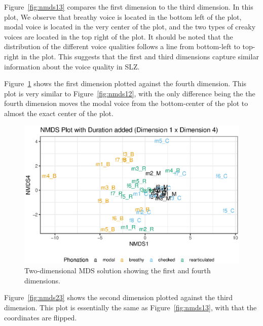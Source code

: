 Figure~\ref{fig:nmds13} compares the first dimension to the third dimension. In this plot, We observe that breathy voice is located in the bottom left of the plot, modal voice is located in the very center of the plot, and the two types of creaky voices are located in the top right of the plot. It should be noted that the distribution of the different voice qualities follows a line from bottom-left to top-right in the plot. This suggests that the first and third dimensions capture similar information about the voice quality in SLZ.


Figure~\ref{fig:nmds14} shows the first dimension plotted against the fourth dimension. This plot is very similar to Figure~\ref{fig:nmds12}, with the only difference being the the fourth dimension moves the modal voice from the bottom-center of the plot to almost the exact center of the plot.

\begin{figure}[!h]
    \centering
    \includegraphics[width = 0.9\linewidth]{images/MDS/nmds14_dur.eps}
    \caption{Two-dimensional MDS solution showing the first and fourth dimensions.}
    \label{fig:nmds14}
\end{figure}

Figure~\ref{fig:nmds23} shows the second dimension plotted against the third dimension. This plot is essentially the same as Figure~\ref{fig:nmds13}, with that the coordinates are flipped.

